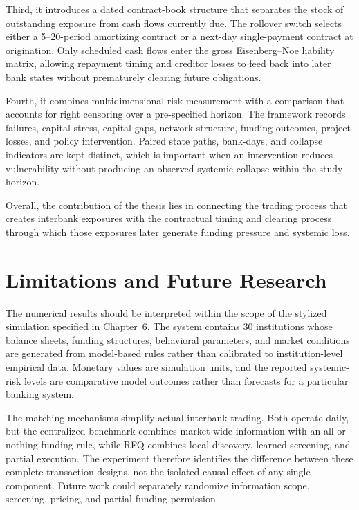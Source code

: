 Third, it introduces a dated contract-book structure that separates the
stock of outstanding exposure from cash flows currently due. The
rollover switch selects either a 5--20-period amortizing contract or a
next-day single-payment contract at origination. Only scheduled cash flows enter the gross Eisenberg--Noe
liability matrix, allowing repayment timing and creditor losses to feed
back into later bank states without prematurely clearing future
obligations.

Fourth, it combines multidimensional risk measurement with a comparison
that accounts for right censoring over a pre-specified horizon. The
framework records failures, capital stress, capital gaps, network
structure, funding outcomes, project losses, and policy intervention.
Paired state paths, bank-days, and collapse indicators are kept distinct,
which is important when an intervention reduces vulnerability without
producing an observed systemic collapse within the study horizon.

Overall, the contribution of the thesis lies in connecting the trading
process that creates interbank exposures with the contractual timing and
clearing process through which those exposures later generate funding
pressure and systemic loss.

\section{Limitations and Future Research}

The numerical results should be interpreted within the scope of the
stylized simulation specified in Chapter~6. The system contains 30 institutions whose balance
sheets, funding structures, behavioral parameters, and market conditions
are generated from model-based rules rather than calibrated to
institution-level empirical data. Monetary values are simulation units,
and the reported systemic-risk levels are comparative model outcomes
rather than forecasts for a particular banking system.

The matching mechanisms simplify actual interbank trading. Both operate
daily, but the centralized benchmark combines market-wide information
with an all-or-nothing funding rule, while RFQ combines local discovery,
learned screening, and partial execution. The experiment therefore
identifies the difference between these complete transaction designs,
not the isolated causal effect of any single component. Future work
could separately randomize information scope, screening, pricing, and
partial-funding permission.

